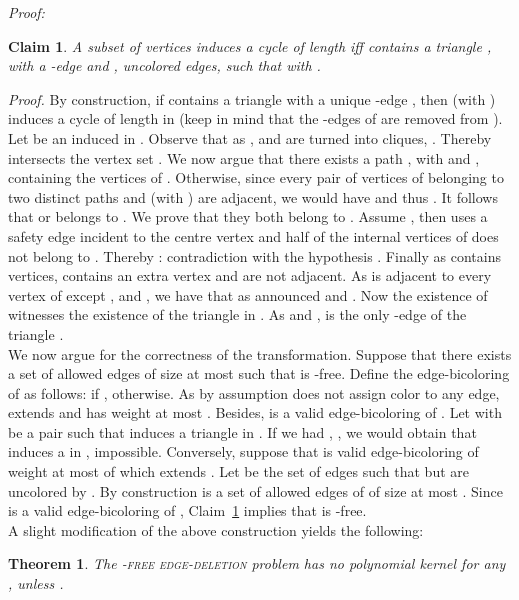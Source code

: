 \documentclass[11pt]{article}
\newenvironment{proof}{\noindent\textit{Proof: }}{{\hfill }}
\newtheorem{theorem}[lemma]{Theorem}
\newtheorem{claim}[lemma]{Claim}
\begin{document}
\begin{proof}
\begin{claim}
\label{claim:nokernel-cl}
A subset of vertices  induces a cycle of length  iff  contains a triangle ,  
with  a -edge and ,  uncolored edges, such that  with .
\end{claim}

\emph{Proof.} By construction, if  contains a triangle  with a unique -edge , then  (with ) induces a cycle of length  in  (keep in mind that the -edges of  are removed from ).
Let  be an induced  in . Observe that as ,  and  are turned into cliques, . Thereby  intersects the vertex set . We now argue that there exists a path , with  and , containing the vertices of . Otherwise, since every pair of vertices of  belonging to two distinct paths  and  (with ) are adjacent, we would have  and thus . It follows that  or  belongs to . We prove that they both belong to . Assume , then  uses a safety edge incident to the centre vertex  and half of the internal vertices of  does not belong to . Thereby : contradiction with the hypothesis . Finally as  contains  vertices,  contains an extra vertex and  are not adjacent. As  is adjacent to every vertex of  except ,  and , we have that  as announced and . Now the existence of  witnesses the existence of the triangle  in . As  and ,  is the only -edge of the triangle .
\hfill  \\

We now argue for the correctness of the transformation. Suppose that there exists a set  of allowed edges of size at most  such that  is -free. Define the edge-bicoloring  of  as follows:  if ,  otherwise. As by assumption  does not assign color  to any edge,  extends  and has weight at most .
Besides,  is a valid edge-bicoloring of . Let  with  be a pair such that  induces a triangle in . If we had , , we would obtain that  induces a  in , impossible. Conversely, suppose that  is valid edge-bicoloring of weight at most  of  which extends . Let  be the set of edges such that  but are uncolored by . By construction  is a set of allowed edges of  of size at most . Since  is a valid edge-bicoloring of , Claim~\ref{claim:nokernel-cl} implies that  is -free. 
 \end{proof}\\
 
A slight modification of the above construction yields the following:

\begin{theorem} \label{prop4} 
The \textsc{-free edge-deletion} problem has no polynomial kernel for any , unless .
\end{theorem}
\end{document}
